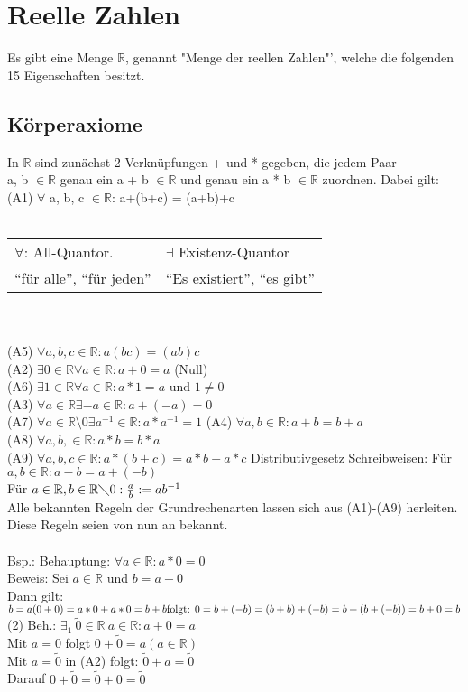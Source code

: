 \documentclass[a4paper, 12pt]{article}
\begin{document}
\section{Reelle Zahlen}
Es gibt eine Menge $\mathbb{R}$, genannt "Menge der reellen Zahlen"', welche die folgenden 15 Eigenschaften besitzt.
	\subsection{Körperaxiome}
	In $\mathbb{R}$ sind zunächst 2 Verknüpfungen + und * gegeben, die jedem Paar\\ a, b $\in \mathbb{R}$ genau ein a + b $\in \mathbb{R}$ und genau ein a * b $\in \mathbb{R}$ zuordnen.
	Dabei gilt:\\
	(A1) $\forall$ a, b, c $\in \mathbb{R}$: a+(b+c) = (a+b)+c\\\\
	\begin{tabular}{l|l}
		$\forall$: All-Quantor. & $\exists$ Existenz-Quantor \\
		"`für alle"', "`für jeden"' & "`Es existiert"', "`es gibt"'
	\end{tabular}
	\\
	\\
	(A5) $\forall a, b, c \in \mathbb{R}: a(bc) = (ab)c$ \\
	(A2) $\exists 0 \in \mathbb{R} \forall a \in \mathbb{R}: a + 0 = a$ (Null) \\
	(A6) $\exists 1 \in \mathbb{R} \forall a \in \mathbb{R}: a*1 = a \text{ und } 1 \neq 0$ \\
	(A3) $\forall a \in \mathbb{R} \exists -a \in \mathbb{R}: a + (-a) = 0$\\
	(A7) $\forall a \in \mathbb{R} \setminus {0} \exists a^{-1} \in \mathbb{R}: a * a^{-1} = 1$
	(A4) $\forall a, b \in \mathbb{R}: a+b = b+a$\\
	(A8) $\forall a, b, \in \mathbb{R} : a*b = b*a$\\
	(A9) $\forall a, b, c \in \mathbb{R}: a*(b+c) = a*b + a*c$ Distributivgesetz
	Schreibweisen: Für $a, b \in \mathbb{R}: a-b = a+(-b)$\\
	Für $ a \in \mathbb{R}, b \in \mathbb{R} \diagdown{0}: \frac{a}{b}: = ab^{-1}$\\
	Alle bekannten Regeln der Grundrechenarten lassen sich aus (A1)-(A9) herleiten.
	Diese Regeln seien von nun an bekannt.\\
	\\
	Bsp.: Behauptung: $\forall a \in \mathbb{R}: a* 0 = 0$\\
	Beweis: Sei $a \in \mathbb{R}$ und $b =a-0$\\
	Dann gilt: $ b = a(0+0) = a*0+a*0=b+b \\ \text{folgt: } 0=b+(-b) = (b+b) +(-b) = b+(b+(-b)) = b+0 = b$\\
	(2) Beh.: $\exists_{1} \ \tilde{0} \in \mathbb{R} \ a \in \mathbb{R}: a+0 = a$ \\
	Mit $a=0$ folgt $0+\tilde{0} = a(a \in \mathbb{R})$\\
	Mit $a= \tilde{0}$ in (A2) folgt: $ \tilde{0} +a = \tilde{0}$\\
	Darauf $0 + \tilde{0} = \tilde{0}+0=\tilde{0}$\\
	\newpage
\end{document}
